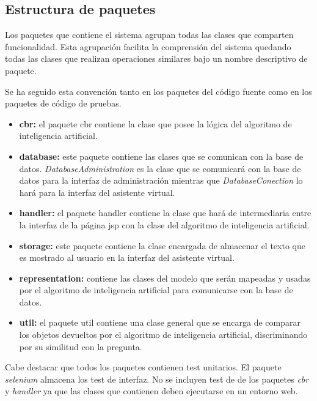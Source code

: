 \subsection{Estructura de paquetes}

Los paquetes que contiene el sistema agrupan todas las clases que comparten funcionalidad. Esta agrupación facilita la comprensión del sistema quedando todas las clases que realizan operaciones similares bajo un nombre descriptivo de paquete.

Se ha seguido esta convención tanto en los paquetes del código fuente como en los paquetes de código de pruebas.


\begin{itemize}
\tightlist
\item \textbf{cbr:} el paquete cbr contiene la clase que posee la lógica del algoritmo de inteligencia artificial.
\item \textbf{database:} este paquete contiene las clases que se comunican con la base de datos. \emph{DatabaseAdministration} es la clase que se comunicará con la base de datos para la interfaz de administración mientras que \emph{DatabaseConection} lo hará para la interfaz del asistente virtual.
\item \textbf{handler:} el paquete handler contiene la clase que hará de intermediaria entre la interfaz de la página jsp con la clase del algoritmo de inteligencia artificial.
\item \textbf{storage:} este paquete contiene la clase encargada de almacenar el texto que es mostrado al usuario en la interfaz del asistente virtual.
\item \textbf{representation:} contiene las clases del modelo que serán mapeadas y usadas por el algoritmo de inteligencia artificial para comunicarse con la base de datos.
\item \textbf{util:} el paquete util contiene una clase general que se encarga de comparar los objetos devueltos por el algoritmo de inteligencia artificial, discriminando por su similitud con la pregunta.
\end{itemize}


Cabe destacar que todos los paquetes contienen test unitarios. El paquete \emph{selenium} almacena los test de interfaz. No se incluyen test de de los paquetes \emph{cbr} y \emph{handler} ya que las clases que contienen deben ejecutarse en un entorno web.

